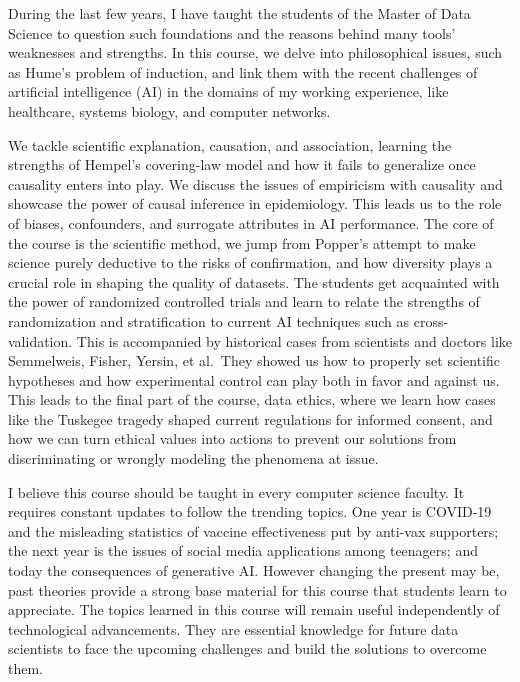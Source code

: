 \documentclass[
  12pt,
]{book}
\begin{document}
During the last few years, I have taught the students of the Master of Data Science to question such foundations and the reasons behind many tools' weaknesses and strengths. In this course, we delve into philosophical issues, such as Hume's problem of induction, and link them with the recent challenges of artificial intelligence (AI) in the domains of my working experience, like healthcare, systems biology, and computer networks.

We tackle scientific explanation, causation, and association, learning the strengths of Hempel's covering-law model and how it fails to generalize once causality enters into play. We discuss the issues of empiricism with causality and showcase the power of causal inference in epidemiology. This leads us to the role of biases, confounders, and surrogate attributes in AI performance. The core of the course is the scientific method, we jump from Popper's attempt to make science purely deductive to the risks of confirmation, and how diversity plays a crucial role in shaping the quality of datasets. The students get acquainted with the power of randomized controlled trials and learn to relate the strengths of randomization and stratification to current AI techniques such as cross-validation. This is accompanied by historical cases from scientists and doctors like Semmelweis, Fisher, Yersin, et al.~They showed us how to properly set scientific hypotheses and how experimental control can play both in favor and against us. This leads to the final part of the course, data ethics, where we learn how cases like the Tuskegee tragedy shaped current regulations for informed consent, and how we can turn ethical values into actions to prevent our solutions from discriminating or wrongly modeling the phenomena at issue.

I believe this course should be taught in every computer science faculty. It requires constant updates to follow the trending topics. One year is COVID-19 and the misleading statistics of vaccine effectiveness put by anti-vax supporters; the next year is the issues of social media applications among teenagers; and today the consequences of generative AI. However changing the present may be, past theories provide a strong base material for this course that students learn to appreciate. The topics learned in this course will remain useful independently of technological advancements. They are essential knowledge for future data scientists to face the upcoming challenges and build the solutions to overcome them.
\end{document}
